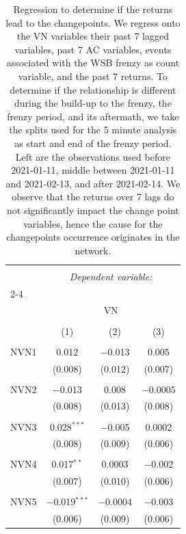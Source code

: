 
\begin{table}[!htbp] \centering 
  \caption{Regression to determine if the returns lead to the changepoints. We regress 
onto the VN variables their past 7 lagged variables, past 7 AC variables, events associated with the WSB frenzy as count variable, and 
the past 7 returns. To determine if the relationship is different during the build-up to the frenzy, the frenzy period, and its aftermath, we 
take the splits used for the 5 minute analysis as start and end of the frenzy period. Left are the observations used before 2021-01-11, middle between 2021-01-11 and 2021-02-13, and after 
2021-02-14. We observe that the returns over 7 lags do not significantly impact the change point variables, 
hence the cause for the changepoints occurrence originates in the network.} 
  \label{VN_reg_robust} 
\scriptsize 
\begin{tabular}{@{\extracolsep{5pt}}lccc} 
\\[-1.8ex]\hline 
\hline \\[-1.8ex] 
 & \multicolumn{3}{c}{\textit{Dependent variable:}} \\ 
\cline{2-4} 
\\[-1.8ex] & \multicolumn{3}{c}{VN} \\ 
\\[-1.8ex] & (1) & (2) & (3)\\ 
\hline \\[-1.8ex] 
 NVN1 & 0.012 & $-$0.013 & 0.005 \\ 
  & (0.008) & (0.012) & (0.007) \\ 
  & & & \\ 
 NVN2 & $-$0.013 & 0.008 & $-$0.0005 \\ 
  & (0.008) & (0.013) & (0.008) \\ 
  & & & \\ 
 NVN3 & 0.028$^{***}$ & $-$0.005 & 0.0002 \\ 
  & (0.008) & (0.009) & (0.006) \\ 
  & & & \\ 
 NVN4 & 0.017$^{**}$ & 0.0003 & $-$0.002 \\ 
  & (0.007) & (0.010) & (0.006) \\ 
  & & & \\ 
 NVN5 & $-$0.019$^{***}$ & $-$0.0004 & $-$0.003 \\ 
  & (0.006) & (0.009) & (0.006) \\ 

\end{tabular}
\end{table}
